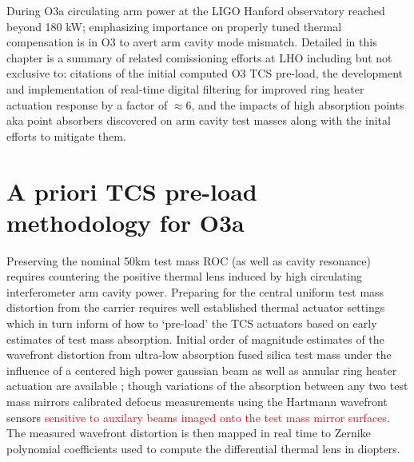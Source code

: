 



During O3a circulating arm power at the LIGO Hanford observatory reached beyond 180 kW; emphasizing importance on properly tuned thermal compensation is in O3 to avert arm cavity mode mismatch. Detailed in this chapter is a summary of related comissioning efforts at LHO including but not exclusive to: citations of the initial computed O3 TCS pre-load, the development and implementation of real-time digital filtering for improved ring heater actuation response by a factor of $\approx 6$, and the impacts of high absorption points aka point absorbers discovered on arm cavity test masses along with the inital efforts to mitigate them. 

\section{A priori TCS pre-load methodology for O3a}
Preserving the nominal 50km test mass ROC (as well as cavity resonance) requires countering the positive thermal lens induced by high circulating interferometer arm cavity power. Preparing for the central uniform test mass distortion from the carrier requires well established thermal actuator settings which in turn inform of how to `pre-load' the TCS actuators based on early estimates of test mass absorption. Initial order of magnitude estimates of the wavefront distortion from ultra-low absorption fused silica test mass under the influence of a centered high power gaussian beam as well as annular ring heater actuation are available \cite{hello_vinet, Ramette:16}; though variations of the absorption between any two test mass mirrors calibrated defocus measurements using the Hartmann wavefront sensors \textcolor{red}{sensitive to auxilary beams imaged onto the test mass mirror surfaces}. The measured wavefront distortion is then mapped in real time to Zernike polynomial coefficients used to compute the differential thermal lens in diopters. 

